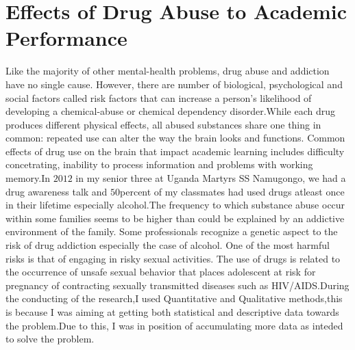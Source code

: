 \documentclass{article}
\begin{document}
\section{ Effects of Drug Abuse to Academic Performance}
Like the majority of other mental-health problems, drug abuse and addiction have no single cause. However, there are number of biological, psychological and social factors called risk factors that can increase a person’s likelihood of developing a chemical-abuse or chemical dependency disorder.While each drug produces different physical effects, all abused substances share one thing in common: repeated use can alter the way the brain looks and functions. Common effects of drug use on the brain that impact academic learning includes difficulty concetrating, inability to process information and problems with working memory.In $2012$ in my senior three at Uganda Martyrs SS Namugongo, we had a drug awareness talk and $50$percent of my classmates had used drugs atleast once in their lifetime especially alcohol.The frequency to which substance abuse occur within some families seems to be higher than could be explained by an addictive environment of the family. Some professionals recognize a genetic aspect to the risk of drug addiction especially the case of alcohol. One of the most harmful risks is that of engaging in risky sexual activities. The use of drugs is related to the occurrence of unsafe sexual behavior that places adolescent at risk for pregnancy of contracting sexually transmitted diseases such as HIV/AIDS.During the conducting of the research,I used Quantitative and Qualitative methods,this is because I was aiming at getting both statistical and descriptive data towards the problem.Due to this, I was in position of accumulating more data as inteded to solve the problem.
\end{document}
